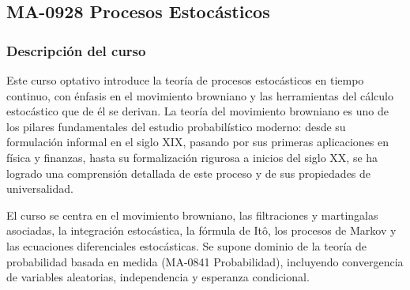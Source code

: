 \newpage
\subsection*{MA-0928 Procesos Estocásticos}

\hypertarget{MA0928}{}
\begin{refsection}
\begin{table}[H]
\end{table}

\subsubsection*{Descripción del curso}

Este curso optativo introduce la teoría de procesos estocásticos en tiempo continuo, con énfasis en el movimiento browniano y las herramientas del cálculo estocástico que de él se derivan. La teoría del movimiento browniano es uno de los pilares fundamentales del estudio probabilístico moderno: desde su formulación informal en el siglo XIX, pasando por sus primeras aplicaciones en física y finanzas, hasta su formalización rigurosa a inicios del siglo XX, se ha logrado una comprensión detallada de este proceso y de sus propiedades de universalidad.

El curso se centra en el movimiento browniano, las filtraciones y martingalas asociadas, la integración estocástica, la fórmula de Itô, los procesos de Markov y las ecuaciones diferenciales estocásticas. Se supone dominio de la teoría de probabilidad basada en medida (MA-0841 Probabilidad), incluyendo convergencia de variables aleatorias, independencia y esperanza condicional.


\end{refsection}
